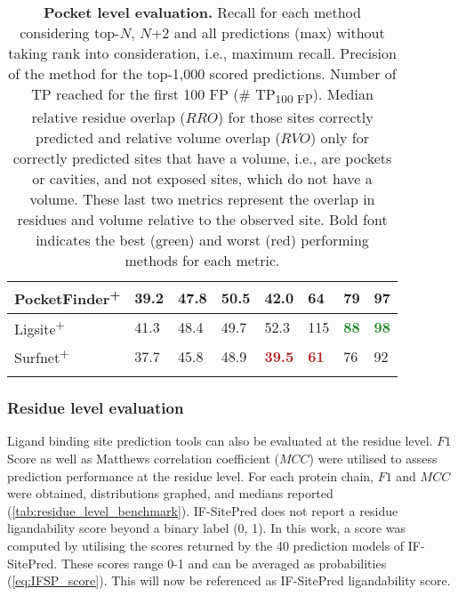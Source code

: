 \begin{landscape}
\begin{longtable}[c]{|M{27mm}|M{27mm}|M{29mm}|M{24mm}|M{27mm}|M{22mm}|M{20mm}|M{20mm}|}
PocketFinder\textsuperscript{+}  & 39.2           & 47.8             & 50.5         & 42.0             & 64          & 79     & 97     \\ \hline
Ligsite\textsuperscript{+}       & 41.3           & 48.4             & 49.7         & 52.3           & 115         & \textbf{\textcolor{forestgreen}{88}}             & \textbf{\textcolor{forestgreen}{98}}             \\ \hline
Surfnet\textsuperscript{+}       & 37.7           & 45.8             & 48.9         & \textbf{\textcolor{firebrick}{39.5}}           & \textbf{\textcolor{firebrick}{61}}                  & 76     & 92     \\ \hline
\caption[Pocket level evaluation]{\textbf{Pocket level evaluation.} Recall for each method considering top-$N$, $N$+2 and all predictions (max) without taking rank into consideration, i.e., maximum recall. Precision of the method for the top-1,000 scored predictions. Number of TP reached for the first 100 FP (\# TP\textsubscript{100 FP}). Median relative residue overlap ($RRO$) for those sites correctly predicted and relative volume overlap ($RVO$) only for correctly predicted sites that have a volume, i.e., are pockets or cavities, and not exposed sites, which do not have a volume. These last two metrics represent the overlap in residues and volume relative to the observed site. Bold font indicates the best (green) and worst (red) performing methods for each metric.}
\label{tab:pocket_level_benchmark}\\
\end{longtable}
\end{landscape}

\subsubsection{Residue level evaluation}

Ligand binding site prediction tools can also be evaluated at the residue level. $F1$ Score as well as Matthews correlation coefficient ($MCC$) were utilised to assess prediction performance at the residue level. For each protein chain, $F1$ and $MCC$ were obtained, distributions graphed, and medians reported (\autoref{tab:residue_level_benchmark}). IF-SitePred does not report a residue ligandability score beyond a binary label (0, 1). In this work, a score was computed by utilising the scores returned by the 40 prediction models of IF-SitePred. These scores range 0-1 and can be averaged as probabilities (\autoref{eq:IFSP_score}). This will now be referenced as IF-SitePred ligandability score.


